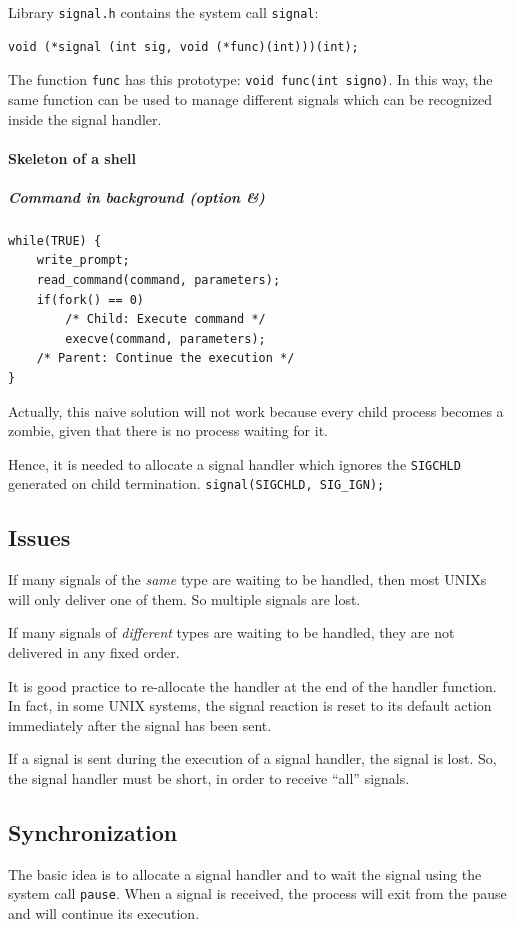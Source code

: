 Library \texttt{signal.h} contains the system call \texttt{signal}:
\begin{verbatim}
void (*signal (int sig, void (*func)(int)))(int);
\end{verbatim}

The function \texttt{func} has this prototype: \texttt{void func(int signo)}. In this way, the same function can be used to manage different signals which can be recognized inside the signal handler.

\paragraph{Skeleton of a shell}
\subparagraph{Command in background (option \&)}
\begin{verbatim}
while(TRUE) {
    write_prompt;
    read_command(command, parameters);
    if(fork() == 0)
        /* Child: Execute command */
        execve(command, parameters);
    /* Parent: Continue the execution */
}
\end{verbatim}
Actually, this naive solution will not work because every child process becomes a zombie, given that there is no process waiting for it.

Hence, it is needed to allocate a signal handler which ignores the \texttt{SIGCHLD} generated on child termination. \texttt{signal(SIGCHLD, SIG\_IGN);}

\subsection{Issues}
If many signals of the \emph{same} type are waiting to be handled, then most UNIXs will only deliver one of them. So multiple signals are lost.

If many signals of \emph{different} types are waiting to be handled, they are not delivered in any fixed order.

It is good practice to re-allocate the handler at the end of the handler function. In fact, in some UNIX systems, the signal reaction is reset to its default action immediately after the signal has been sent.

If a signal is sent during the execution of a signal handler, the signal is lost. So, the signal handler must be short, in order to receive
``all'' signals.

\subsection{Synchronization}
The basic idea is to allocate a signal handler and to wait the signal using the system call \texttt{pause}. When a signal is received, the process will exit from the pause and will continue its execution.

